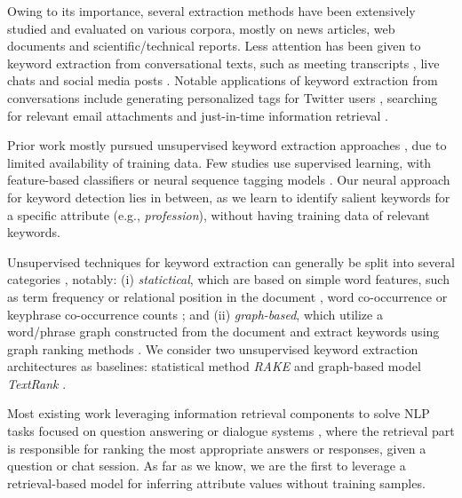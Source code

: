 Owing to its importance, several extraction methods have been extensively studied and evaluated on various corpora, mostly on news articles, web documents and scientific/technical reports. Less attention has been given to keyword extraction from conversational texts, such as meeting transcripts \cite{liu-etal-2009-unsupervised,7045531}, live chats \cite{kim-baldwin-2012-extracting} and social media posts \cite{Zhao:2011:TKE:2002472.2002521,wu-etal-2010-automatic-generation,zhang-etal-2016-keyphrase}.
Notable applications of keyword extraction from conversations include 
generating personalized tags for Twitter users \cite{wu-etal-2010-automatic-generation}, searching for relevant email attachments \cite{van2017reply} and just-in-time information retrieval \cite{7045531}.

Prior work 
mostly
pursued unsupervised keyword extraction approaches \cite{mihalcea2004textrank, rose2010automatic},
due to limited availability of
training data. Few studies use supervised learning, with feature-based classifiers \cite{kim-baldwin-2012-extracting} 
or neural sequence tagging models \cite{zhang-etal-2016-keyphrase}. 
Our neural approach for keyword detection 
lies in between, as we 
learn to identify 
salient keywords for a specific attribute (e.g., \emph{profession}),
without having training data of relevant keywords.

Unsupervised techniques for keyword extraction can generally be split into several categories \cite{hasan-ng-2014-automatic}, notably: (i) \textit{statictical}, which are based on simple word features, such as term frequency or relational position in the document \cite{ramos2003using, campos2018yake}, word co-occurrence \cite{matsuo2004keyword} or keyphrase co-occurrence counts \cite{rose2010automatic}; and (ii) \textit{graph-based}, which utilize a word/phrase graph constructed from the document and extract keywords using graph ranking methods \cite{mihalcea2004textrank, bougouin:hal-00917969}. We consider two unsupervised keyword extraction architectures as baselines: statistical method \textit{RAKE} \cite{rose2010automatic} and graph-based model \textit{TextRank} \cite{mihalcea2004textrank}.


Most existing work leveraging information retrieval components to solve NLP tasks focused on question answering  %
\cite{kratzwald-feuerriegel-2018-adaptive,wang2018r, guu2020realm}
or dialogue systems 
\cite{feng-etal-2019-learning,Luo2019Personalized},
where the retrieval part is responsible for ranking the most appropriate answers or responses, given a question or chat session. As far as we know, we are the first to leverage a retrieval-based 
model for inferring 
attribute values without training samples.

